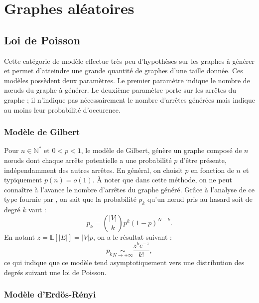 \documentclass[a4paper]{article}
\begin{document}
\section{Graphes aléatoires}
\label{sec:graphes_aleatoires}

    \subsection{Loi de Poisson}
    \label{sub:loi_de_poisson}
        Cette catégorie de modèle effectue très peu d'hypothèses sur les
        graphes à générer et permet d'atteindre une grande quantité de graphes
        d'une taille donnée. Ces modèles possèdent deux paramètres. Le premier
        paramètre indique le nombre de n\oe{}uds du graphe à générer. Le
        deuxième paramètre porte sur les arrêtes du graphe ; il n'indique pas
        nécessairement le nombre d'arrêtes générées mais indique au moins leur
        probabilité d'occurence.

        \subsubsection{Modèle de Gilbert}
            Pour $n \in \mathbb{N}^*$ et $0 < p < 1$, le modèle de Gilbert,
            génère un graphe composé de $n$ n\oe{}uds dont chaque arrête
            potentielle a une probabilité $p$ d'être présente, indépendamment
            des autres arrêtes.
            En général, on choisit $p$ en fonction de $n$ et typiquement
            $p(n) = o(1)$. \`A noter que dans cette méthode, on ne peut
            connaître à l'avance le nombre d'arrêtes du graphe généré.
            Gr\^ace à l'analyse de ce type fournie par \cite{newman2001random},
            on sait que la probabilité $p_k$ qu'un n\oe{}ud pris au hasard
            soit de degré $k$ vaut :
            \[
                p_k = \binom{|V|}{k} p^k (1 - p)^{N - k}.
            \]
            En notant $z = \mathbb{E}\left[|E|\right] = |V|p$, on a le résultat
            suivant :
            \[
                p_k \underset{N \rightarrow +\infty}{\sim}
                \frac{z^k e^{-z}}{k!},
            \]
            ce qui indique que ce modèle tend asymptotiquement vers une
            distribution des degrés suivant une loi de Poisson.

        \subsubsection{Modèle d'Erdös-Rényi}
\end{document}
